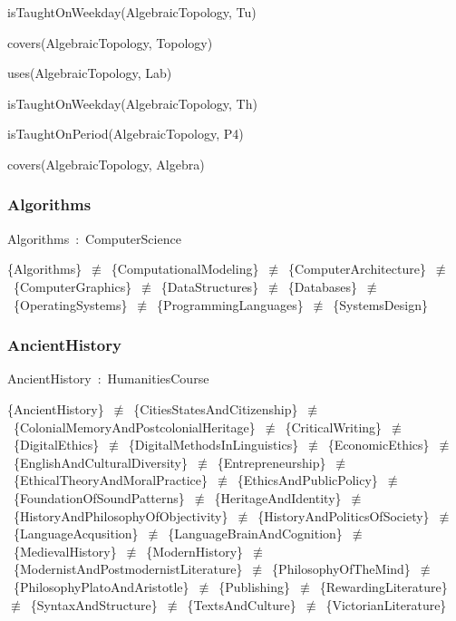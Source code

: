 \documentclass{article}
\begin{document}
isTaughtOnWeekday(AlgebraicTopology, Tu)

covers(AlgebraicTopology, Topology)

uses(AlgebraicTopology, Lab)

isTaughtOnWeekday(AlgebraicTopology, Th)

isTaughtOnPeriod(AlgebraicTopology, P4)

covers(AlgebraicTopology, Algebra)

\subsubsection*{Algorithms}

Algorithms~:~ComputerScience

\{Algorithms\}~\ensuremath{\not\equiv}~\{ComputationalModeling\}~\ensuremath{\not\equiv}~\{ComputerArchitecture\}~\ensuremath{\not\equiv}~\{ComputerGraphics\}~\ensuremath{\not\equiv}~\{DataStructures\}~\ensuremath{\not\equiv}~\{Databases\}~\ensuremath{\not\equiv}~\{OperatingSystems\}~\ensuremath{\not\equiv}~\{ProgrammingLanguages\}~\ensuremath{\not\equiv}~\{SystemsDesign\}

\subsubsection*{AncientHistory}

AncientHistory~:~HumanitiesCourse

\{AncientHistory\}~\ensuremath{\not\equiv}~\{CitiesStatesAndCitizenship\}~\ensuremath{\not\equiv}~\{ColonialMemoryAndPostcolonialHeritage\}~\ensuremath{\not\equiv}~\{CriticalWriting\}~\ensuremath{\not\equiv}~\{DigitalEthics\}~\ensuremath{\not\equiv}~\{DigitalMethodsInLinguistics\}~\ensuremath{\not\equiv}~\{EconomicEthics\}~\ensuremath{\not\equiv}~\{EnglishAndCulturalDiversity\}~\ensuremath{\not\equiv}~\{Entrepreneurship\}~\ensuremath{\not\equiv}~\{EthicalTheoryAndMoralPractice\}~\ensuremath{\not\equiv}~\{EthicsAndPublicPolicy\}~\ensuremath{\not\equiv}~\{FoundationOfSoundPatterns\}~\ensuremath{\not\equiv}~\{HeritageAndIdentity\}~\ensuremath{\not\equiv}~\{HistoryAndPhilosophyOfObjectivity\}~\ensuremath{\not\equiv}~\{HistoryAndPoliticsOfSociety\}~\ensuremath{\not\equiv}~\{LanguageAcqusition\}~\ensuremath{\not\equiv}~\{LanguageBrainAndCognition\}~\ensuremath{\not\equiv}~\{MedievalHistory\}~\ensuremath{\not\equiv}~\{ModernHistory\}~\ensuremath{\not\equiv}~\{ModernistAndPostmodernistLiterature\}~\ensuremath{\not\equiv}~\{PhilosophyOfTheMind\}~\ensuremath{\not\equiv}~\{PhilosophyPlatoAndAristotle\}~\ensuremath{\not\equiv}~\{Publishing\}~\ensuremath{\not\equiv}~\{RewardingLiterature\}~\ensuremath{\not\equiv}~\{SyntaxAndStructure\}~\ensuremath{\not\equiv}~\{TextsAndCulture\}~\ensuremath{\not\equiv}~\{VictorianLiterature\}
\end{document}

